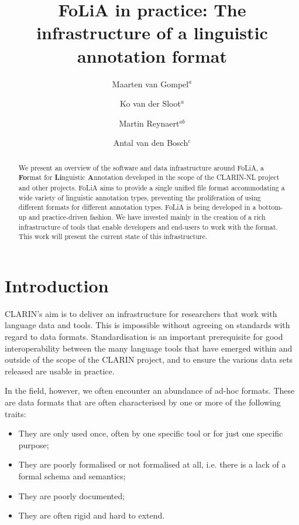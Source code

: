 \documentclass[a4paper,11pt]{article}
\begin{document}
\title{FoLiA in practice: The infrastructure of a linguistic annotation format}
\author{Maarten van Gompel$^a$ \and Ko van der
    Sloot$^a$ \and Martin Reynaert$^{ab}$ \and Antal van den Bosch$^c$} %
\date{}


\maketitle
\renewcommand{\thefootnote}{\alph{footnote}}
\renewcommand{\thefootnote}{\arabic{footnote}}

\begin{abstract}
We present an overview of the software and data infrastructure around FoLiA, a
\textbf{Fo}rmat for \textbf{Li}nguistic \textbf{A}nnotation developed in the
scope of the CLARIN-NL project and other projects.  FoLiA aims to provide a
single unified file format accommodating a wide variety of linguistic
annotation types, preventing the proliferation of using different formats for
different annotation types. FoLiA is being developed in a bottom-up and
practice-driven fashion.  We have invested mainly in the creation of a rich
infrastructure of tools that enable developers and end-users to work with the
format. This work will present the current state of this infrastructure.
\end{abstract}


\section{Introduction}

CLARIN's aim is to deliver an infrastructure for researchers that work with
language data and tools. This is impossible without agreeing on standards with
regard to data formats. Standardisation is an important prerequisite for good
interoperability between the many language tools that have emerged within and
outside of the scope of the CLARIN project, and to ensure the various data sets
released are usable in practice.

In the field, however, we often encounter an abundance of ad-hoc formats. These are
data formats that are often characterised by one or more of the following traits:

\begin{itemize}
    \item They are only used once, often by one specific tool or for just one specific purpose;
    \item They are poorly formalised or not formalised at all, i.e. there is a lack of a formal schema and semantics;
    \item They are poorly documented;
    \item They are often rigid and hard to extend.
\end{itemize}
\end{document}
